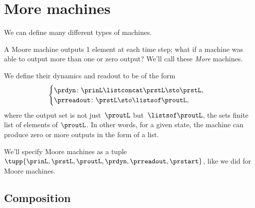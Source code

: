 
\section{More machines}
\label{sec:more-machines}

We can define many different types of machines.

A Moore machine outputs 1 element at each time step; what if a machine was able to output more than one or zero output?
We'll call these \emph{More} machines.

We define their dynamics and readout to be of the form
%
\begin{equation}
    \label{eq:more-signature}
    \begin{cases}
        \prdyn \colon  \prinL \listconcat \prstL \sto \prstL, \\
        \prreadout \colon \prstL  \sto \listsof \proutL,
    \end{cases}
\end{equation}
%
where the output set is not just~$\proutL$ but~$\listsof \proutL$, the sets finite list of elements of $\proutL$.
In other words, for a given state, the machine can produce zero or more outputs in the form of a list.

We'll specify Moore machines as a tuple $\tupp{\prinL,\prstL,\proutL,\prdyn,\prreadout,\prstart}$, like we did for Moore machines.

\subsection{Composition}

